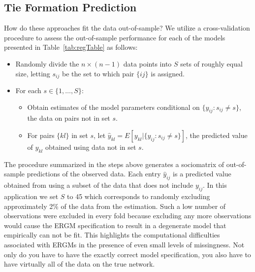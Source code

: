 \documentclass[11pt,pdflatex]{elsarticle}
\begin{document}
\subsection{Tie Formation Prediction}

How do these approaches fit the data out-of-sample? We utilize a cross-validation procedure to assess the out-of-sample performance for each of the models presented in Table~\ref{tab:regTable} as follows:

\begin{itemize}
	\item Randomly divide the $n \times (n-1)$ data points into $S$ sets of roughly equal size, letting $s_{ij}$ be the set to which pair $\{ij\}$ is assigned.
	\item For each $s \in \{1, \ldots, S\}$:
	\begin{itemize}
		\item Obtain estimates of the model parameters conditional on $\{y_{ij} : s_{ij} \neq s\}$, the data on pairs not in set $s$.
		\item For pairs $\{kl\}$ in set $s$, let $\hat y_{kl} = E[y_{kl} | \{y_{ij} : s_{ij} \neq s\}]$, the predicted value of $y_{kl}$ obtained using data not in set $s$.
	\end{itemize}
\end{itemize}

The procedure summarized in the steps above generates a sociomatrix of out-of-sample predictions of the observed data. Each entry $\hat y_{ij}$ is a predicted value obtained from using a subset of the data that does not include $y_{ij}$. In this application we set $S$ to 45 which corresponds to randomly excluding approximately 2\% of the data from the estimation. Such a low number of observations were excluded in every fold because excluding any more observations would cause the ERGM specification to result in a degenerate model that empirically can not be fit. This highlights the computational difficulties associated with ERGMs in the presence of even small levels of missingness.  Not only do you have to have the exactly correct model specification, you also have to have virtually all of the data on the true network.
\end{document}
